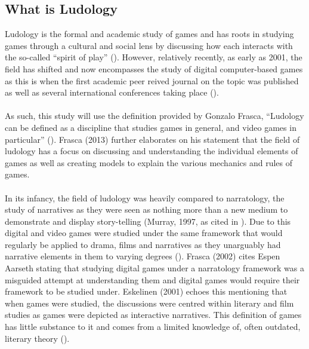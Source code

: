 \subsection{What is Ludology}
Ludology is the formal and academic study of games and has roots in studying games through a cultural and social lens by discussing how each interacts with the so-called “spirit of play” (\cite{Huizinga1949}). However, relatively recently, as early as 2001, the field has shifted and now encompasses the study of digital computer-based games as this is when the first academic peer reived journal on the topic was published as well as several international conferences taking place (\cite{Frasca2013}). 
\\\\
As such, this study will use the definition provided by Gonzalo Frasca, “Ludology can be defined as a discipline that studies games in general, and video games in particular” (\cite{Frasca2013}). Frasca (2013) further elaborates on his statement that the field of ludology has a focus on discussing and understanding the individual elements of games as well as creating models to explain the various mechanics and rules of games. 
\\\\
In its infancy, the field of ludology was heavily compared to narratology, the study of narratives as they were seen as nothing more than a new medium to demonstrate and display story-telling (Murray, 1997, as cited in \cite{Frasca2002}). Due to this digital and video games were studied under the same framework that would regularly be applied to drama, films and narratives as they unarguably had narrative elements in them to varying degrees (\cite{Manovich2002}). Frasca (2002) cites Espen Aarseth stating that studying digital games under a narratology framework was a misguided attempt at understanding them and digital games would require their framework to be studied under. Eskelinen (2001) echoes this mentioning that when games were studied, the discussions were centred within literary and film studies as games were depicted as interactive narratives. This definition of games has little substance to it and comes from a limited knowledge of, often outdated, literary theory (\cite{Eskelinen2001}).

